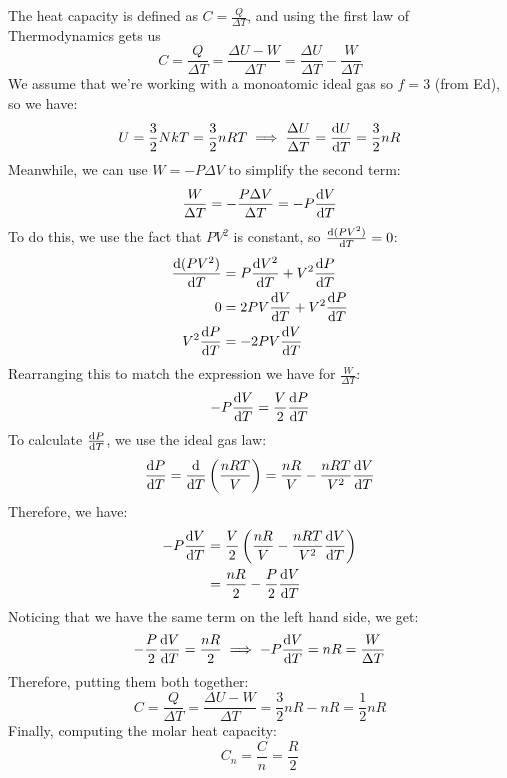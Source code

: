 \documentclass[10pt]{article}
\begin{document}
	\begin{solution}
		The heat capacity is defined as $C = \frac{Q}{\Delta T}$, and using the first law of Thermodynamics
		gets us
		\[
			C = \frac{Q}{\Delta T} = \frac{\Delta U - W}{\Delta T} = \frac{\Delta U}{\Delta T} -
			\frac{W}{\Delta T}
		\] 
		We assume that we're working with a monoatomic ideal gas so $f = 3$ (from Ed), so we have:
		\[
			U = \frac{3}{2}NkT = \frac{3}{2}nRT \implies \frac{\Delta U}{\Delta T} = \dv{U}{T} = \frac{3}{2}nR
		\] 
		Meanwhile, we can use $W = -P\Delta V$ to simplify the second term:
		\[
			\frac{W}{\Delta T} = -\frac{P \Delta V}{\Delta T} = -P \dv{V}{T}
		\] 
		To do this, we use the fact that $PV^2$ is constant, so $\dv{(PV^2)}{T} = 0$:
		\begin{align*}
			\dv{(PV^2)}{T} &= P \dv{V^2}{T} + V^2 \dv{P}{T}\\
			0 &= 2PV \dv{V}{T} + V^2 \dv{P}{T}\\
			V^2 \dv{P}{T} &= -2PV \dv{V}{T}
		\end{align*}
		Rearranging this to match the expression we have for $\frac{W}{\Delta T}$:
		\[
			-P  \dv{V}{T} = \frac{V}{2} \dv{P}{T} 
		\] 
		To calculate $\dv{P}{T}$, we use the ideal gas law:
		\[
			\dv{P}{T} = \dv{T}\left( \frac{nRT}{V} \right) = \frac{nR}{V} - \frac{nRT}{V^2} \dv{V}{T}
		\] 
		Therefore, we have:
		\begin{align*}
			-P \dv{V}{T} &= \frac{V}{2}\left( \frac{nR}{V} - \frac{nRT}{V^2}\dv{V}{T} \right) \\
						 &= \frac{nR}{2} - \frac{P}{2} \dv{V}{T} 
		\end{align*} 
		Noticing that we have the same term on the left hand side, we get:
		\[
			-\frac{P}{2} \dv{V}{T} = \frac{nR}{2} \implies -P \dv{V}{T} = nR = \frac{W}{\Delta T}
		\] 
		Therefore, putting them both together:
		\[
			C = \frac{Q}{\Delta T} = \frac{\Delta U - W}{\Delta T} = \frac{3}{2}nR - nR = \frac{1}{2}nR
		\] 
		Finally, computing the molar heat capacity:
		\[
		C_n = \frac{C}{n} = \frac{R}{2}
		\] 
	\end{solution}
\end{document}
